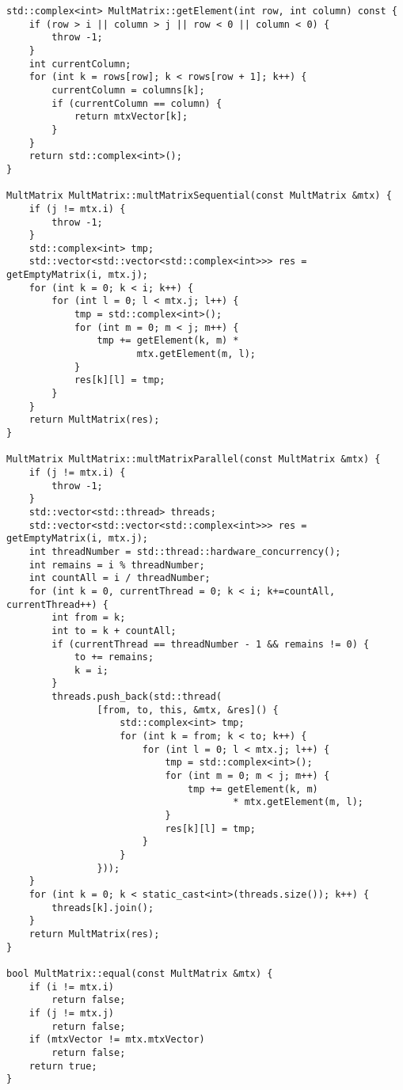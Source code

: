 \documentclass{report}
\begin{document}
\begin{lstlisting}
std::complex<int> MultMatrix::getElement(int row, int column) const {
    if (row > i || column > j || row < 0 || column < 0) {
        throw -1;
    }
    int currentColumn;
    for (int k = rows[row]; k < rows[row + 1]; k++) {
        currentColumn = columns[k];
        if (currentColumn == column) {
            return mtxVector[k];
        }
    }
    return std::complex<int>();
}

MultMatrix MultMatrix::multMatrixSequential(const MultMatrix &mtx) {
    if (j != mtx.i) {
        throw -1;
    }
    std::complex<int> tmp;
    std::vector<std::vector<std::complex<int>>> res = getEmptyMatrix(i, mtx.j);
    for (int k = 0; k < i; k++) {
        for (int l = 0; l < mtx.j; l++) {
            tmp = std::complex<int>();
            for (int m = 0; m < j; m++) {
                tmp += getElement(k, m) *
                       mtx.getElement(m, l);
            }
            res[k][l] = tmp;
        }
    }
    return MultMatrix(res);
}

MultMatrix MultMatrix::multMatrixParallel(const MultMatrix &mtx) {
    if (j != mtx.i) {
        throw -1;
    }
    std::vector<std::thread> threads;
    std::vector<std::vector<std::complex<int>>> res = getEmptyMatrix(i, mtx.j);
    int threadNumber = std::thread::hardware_concurrency();
    int remains = i % threadNumber;
    int countAll = i / threadNumber;
    for (int k = 0, currentThread = 0; k < i; k+=countAll, currentThread++) {
        int from = k;
        int to = k + countAll;
        if (currentThread == threadNumber - 1 && remains != 0) {
            to += remains;
            k = i;
        }
        threads.push_back(std::thread(
                [from, to, this, &mtx, &res]() {
                    std::complex<int> tmp;
                    for (int k = from; k < to; k++) {
                        for (int l = 0; l < mtx.j; l++) {
                            tmp = std::complex<int>();
                            for (int m = 0; m < j; m++) {
                                tmp += getElement(k, m)
                                        * mtx.getElement(m, l);
                            }
                            res[k][l] = tmp;
                        }
                    }
                }));
    }
    for (int k = 0; k < static_cast<int>(threads.size()); k++) {
        threads[k].join();
    }
    return MultMatrix(res);
}

bool MultMatrix::equal(const MultMatrix &mtx) {
    if (i != mtx.i)
        return false;
    if (j != mtx.j)
        return false;
    if (mtxVector != mtx.mtxVector)
        return false;
    return true;
}

\end{lstlisting}
\end{document}
